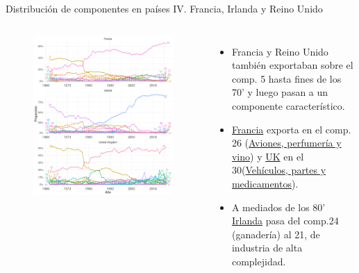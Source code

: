 \documentclass[compress]{beamer}
\begin{document}
\begin{frame}
\small
Distribución de componentes en países IV. Francia, Irlanda y Reino Unido
\scriptsize
\begin{columns}[c] 

\begin{figure}
\includegraphics[width=\linewidth]{graficoLDA_k30_FRA_GBR_IRL}
\end{figure}


\begin{itemize}[label=\faRebel]
\item Francia y Reino Unido también exportaban sobre el comp. 5 hasta fines de los 70' y luego pasan a un componente característico.
\item \underline{Francia} exporta en el comp. 26 (\underline{Aviones, perfumería y vino}) y \underline{UK} en el 30(\underline{Vehículos, partes y medicamentos}).
\item A mediados de los 80' \underline{Irlanda} pasa del comp.24 (ganadería) al 21, de industria de alta complejidad.
\end{itemize}

\end{columns} 

\end{frame}
\end{document}
